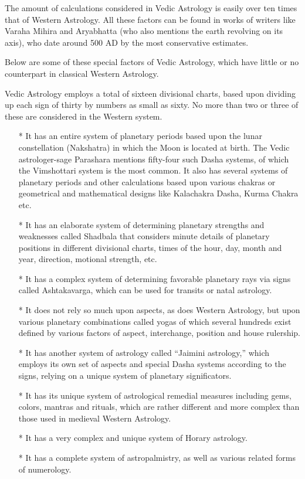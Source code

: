  

The amount of calculations considered in Vedic Astrology is easily over ten times that of Western Astrology. All these factors can be found in works of writers like Varaha Mihira and Aryabhatta (who also mentions the earth revolving on its axis), who date around 500 AD by the most conservative estimates.

 

Below are some of these special factors of Vedic Astrology, which have little or no counterpart in classical Western Astrology.

 

Vedic Astrology employs a total of sixteen divisional charts, based upon dividing up each sign of thirty by numbers as small as sixty. No more than two or three of these are considered in the Western system.
\begin{enumerate}
\item[*] It has an entire system of planetary periods based upon the lunar constellation (Nakshatra) in which the Moon is located at birth. The Vedic astrologer-sage Parashara mentions fifty-four such Dasha systems, of which the Vimshottari system is the most common. It also has several systems of planetary periods and other calculations based upon various chakras or geometrical and mathematical designs like Kalachakra Dasha, Kurma Chakra etc.
\item[*] It has an elaborate system of determining planetary strengths and weaknesses called Shadbala that considers minute details of planetary positions in different divisional charts, times of the hour, day, month and year, direction, motional strength, etc.
\item[*] It has a complex system of determining favorable planetary rays via signs called Ashtakavarga, which can be used for transits or natal astrology.
\item[*] It does not rely so much upon aspects, as does Western Astrology, but upon various planetary combinations called yogas of which several hundreds exist defined by various factors of aspect, interchange, position and house rulership.
\item[*] It has another system of astrology called “Jaimini astrology,” which employs its own set of aspects and special Dasha systems according to the signs, relying on a unique system of planetary significators.
\item[*] It has its unique system of astrological remedial measures including gems, colors, mantras and rituals, which are rather different and more complex than those used in medieval Western Astrology.
\item[*] It has a very complex and unique system of Horary astrology.
\item[*] It has a complete system of astropalmistry, as well as various related forms of numerology.
 \end{enumerate}

